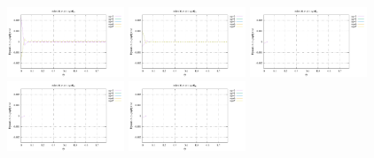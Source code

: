 \noindent
\includegraphics[width=3.5cm]{python_codes/fieldstone_152/RESULTS/exp1/d_t_32_m2}
\includegraphics[width=3.5cm]{python_codes/fieldstone_152/RESULTS/exp1/d_t_32_m3}
\includegraphics[width=3.5cm]{python_codes/fieldstone_152/RESULTS/exp1/d_t_32_m4}
\includegraphics[width=3.5cm]{python_codes/fieldstone_152/RESULTS/exp1/d_t_32_m5}
\includegraphics[width=3.5cm]{python_codes/fieldstone_152/RESULTS/exp1/d_t_32_m6}

